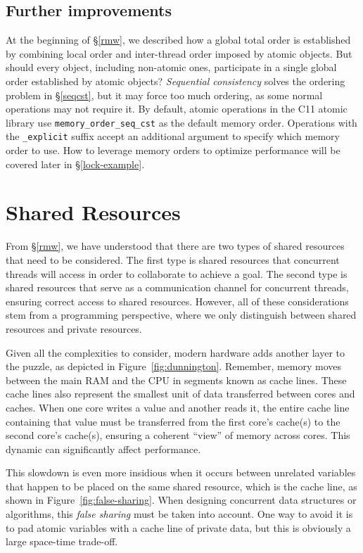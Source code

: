 \documentclass[fontsize=10pt, oneside]{scrartcl}
\newcommand{\monobox}[1]{\mbox{\texttt{#1}}}
\newcommand{\clang}[1]{C}
\newcommand{\fig}[1]{Figure~\ref{#1}}
\newcommand{\introduce}[1]{\textit{#1}}
\newcommand{\secref}[1]{\hyperref[#1]{\textsc{\S}\ref*{#1}}}
\begin{document}
\subsection{Further improvements}
At the beginning of \secref{rmw}, we described how a global total order is established by combining local order and inter-thread order imposed by atomic objects. 
But should every object, including non-atomic ones, participate in a single global order established by atomic objects?
\introduce{Sequential consistency} solves the ordering problem in \secref{seqcst}, but it may force too much ordering, as some normal operations may not require it.
By default, atomic operations in the \clang{}11 atomic library use \monobox{memory\_order\_seq\_cst} as the default memory order. Operations with the \monobox{\_explicit} suffix accept an additional argument to specify which memory order to use.
How to leverage memory orders to optimize performance will be covered later in \secref{lock-example}.

\section{Shared Resources}
\label{shared-resources}
From \secref{rmw}, we have understood that there are two types of shared resources that need to be considered. 
The first type is shared resources that concurrent threads will access in order to collaborate to achieve a goal. 
The second type is shared resources that serve as a communication channel for concurrent threads, 
ensuring correct access to shared resources. 
However, all of these considerations stem from a programming perspective, 
where we only distinguish between shared resources and private resources. 

Given all the complexities to consider, modern hardware adds another layer to the puzzle, 
as depicted in \fig{fig:dunnington}. 
Remember, memory moves between the main \textsc{RAM} and the \textsc{CPU} in segments known as cache lines. 
These cache lines also represent the smallest unit of data transferred between cores and caches. 
When one core writes a value and another reads it, 
the entire cache line containing that value must be transferred from the first core's cache(s) to the second core's cache(s), 
ensuring a coherent ``view'' of memory across cores. This dynamic can significantly affect performance.

This slowdown is even more insidious when it occurs between unrelated variables that happen to be placed on the same shared resource, 
which is the cache line, as shown in \fig{fig:false-sharing}. 
When designing concurrent data structures or algorithms, 
this \introduce{false sharing} must be taken into account. 
One way to avoid it is to pad atomic variables with a cache line of private data, 
but this is obviously a large space-time trade-off.
\end{document}
